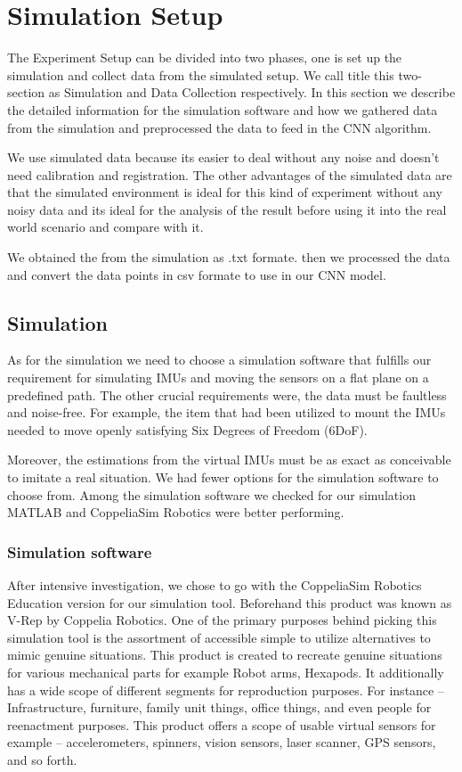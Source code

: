 
\chapter{Simulation Setup}\label{chapter:simulation_setup}
The Experiment Setup can be divided into two phases, one is set up the simulation and collect data from the simulated setup. We call title this two-section as Simulation and Data Collection respectively.
In this section we describe the detailed information for the simulation software and how we gathered data from the simulation and preprocessed the data to feed in the CNN algorithm.

We use simulated data because its easier to deal without any noise and doesn't need calibration and registration. The other advantages of the simulated data are that the simulated environment is ideal for this kind of experiment without any noisy data and its ideal for the analysis of the result before using it into the real world scenario and compare with it.

We obtained the from the simulation as .txt formate. then we processed the data and convert the data points in csv formate to use in our CNN model.

\section{Simulation}
As for the simulation we need to choose a simulation software that fulfills our requirement for simulating IMUs and moving the sensors on a flat plane on a predefined path. The other crucial requirements were, the data must be faultless and noise-free. For example, the item that had been utilized to mount the IMUs needed to move openly satisfying Six Degrees of Freedom (6DoF). 

Moreover, the estimations from the virtual IMUs must be as exact as conceivable to imitate a real situation. We had fewer options for the simulation software to choose from. Among the simulation software we checked for our simulation MATLAB and CoppeliaSim Robotics were better performing.

\subsection{Simulation software}
After intensive investigation, we chose to go with the CoppeliaSim Robotics Education version for our simulation tool. Beforehand this product was known as V-Rep by Coppelia Robotics. One of the primary purposes behind picking this simulation tool is the assortment of accessible simple to utilize alternatives to mimic genuine situations. This product is created to recreate genuine situations for various mechanical parts for example Robot arms, Hexapods. It additionally has a wide scope of different segments for reproduction purposes. For instance – Infrastructure, furniture, family unit things, office things, and even people for reenactment purposes. This product offers a scope of usable virtual sensors for example – accelerometers, spinners, vision sensors, laser scanner, GPS sensors, and so forth. 

